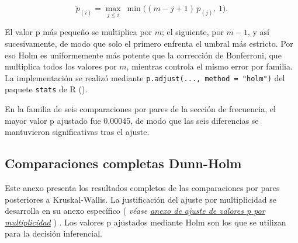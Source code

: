 \documentclass[
  spanish,
  letterpaper,
  DIV=11,
  numbers=noendperiod]{scrartcl}
\newcommand{\asesoriaParenRef}[1]{%
  \textnormal{\textcolor{asesoriaTextColor}{(}}%
  {\hypersetup{linkcolor=asesoriaLinkColor,urlcolor=asesoriaLinkColor,citecolor=asesoriaLinkColor}\textcolor{asesoriaTextColor}{\emph{#1}}}%
  \textnormal{\textcolor{asesoriaTextColor}{)}}%
}
\begin{document}
\[
\widetilde p_{(i)}
=
\max_{j\leq i}
\ \min\big((m-j+1)\,p_{(j)},\,1\big).
\]

El valor p más pequeño se multiplica por \(m\); el siguiente, por
\(m-1\), y así sucesivamente, de modo que solo el primero enfrenta el
umbral más estricto. Por eso Holm es uniformemente más potente que la
corrección de Bonferroni, que multiplica todos los valores por \(m\),
mientras controla el mismo error por familia. La implementación se
realizó mediante \texttt{p.adjust(...,\ method\ =\ "holm")} del paquete
\texttt{stats} de R ().

En la familia de seis comparaciones por pares de la sección de
frecuencia, el mayor valor p ajustado fue 0,00045, de modo que las seis
diferencias se mantuvieron significativas tras el ajuste.

\newpage

\subsection{Comparaciones completas Dunn-Holm}\label{sec-anexo-dunn}

Este anexo presenta los resultados completos de las comparaciones por
pares posteriores a Kruskal-Wallis. La justificación del ajuste por
multiplicidad se desarrolla en su anexo específico
\asesoriaParenRef{véase \hyperref[sec-anexo-ajuste-p]{anexo de ajuste de valores p por multiplicidad}}.
Los valores p ajustados mediante Holm son los que se utilizan para la
decisión inferencial.
\end{document}
